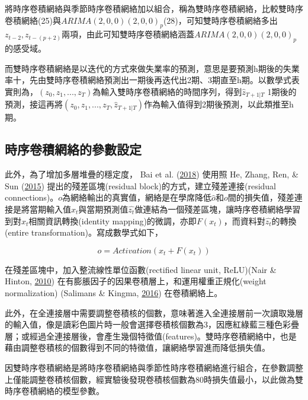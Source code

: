 \documentclass[oneside]{book}
\begin{document}
將時序卷積網絡與季節時序卷積網絡加以組合，稱為雙時序卷積網絡，比較雙時序卷積網絡(25)與\(ARIMA(2,0,0)(2,0,0)_p\)(28)，可知雙時序卷積網絡多出\(z_{t-2},z_{t-(p+2)}\)兩項，由此可知雙時序卷積網絡涵蓋\(ARIMA(2,0,0)(2,0,0)_p\)的感受域。

而雙時序卷積網絡是以迭代的方式來做失業率的預測，意思是要預測h期後的失業率十，先由雙時序卷積網絡預測出一期後再迭代出2期、3期直至h期。以數學式表實則為，\((z_0,z_1,...,z_T)\)為輸入雙時序卷積網絡的時間序列，得到\(\hat{z}_{T+1|T}\) 1期後的預測，接這再將\((z_0,z_1,...,z_T,\hat{z}_{T+1|T})\)作為輸入值得到2期後預測，以此類推至h期。

\hypertarget{ux6642ux5e8fux5377ux7a4dux7db2ux7d61ux7684ux53c3ux6578ux8a2dux5b9a}{%
\subsection{時序卷積網絡的參數設定}\label{ux6642ux5e8fux5377ux7a4dux7db2ux7d61ux7684ux53c3ux6578ux8a2dux5b9a}}

此外，為了增加多層堆疊的穩定度， Bai et al. (\protect\hyperlink{ref-baiEmpiricalEvaluationGeneric2018}{2018}) 使用照 He, Zhang, Ren, \& Sun (\protect\hyperlink{ref-heDeepResidualLearning2015}{2015}) 提出的殘差區塊(residual block)的方式，建立殘差連接(residual connections)。\(o\)為網絡輸出的真實值，網絡是在學席降低\(\hat{o}\)和\(o\)間的損失值，殘差連接是將當期輸入值\(x_t\)與當期預測值\(\hat{z_t}\)做連結為一個殘差區塊，讓時序卷積網絡學習到對\(x_t\)相關資訊轉換(identity mapping)的微調，亦即\(F(x_t)\)，而資料對\(\hat{z_t}\)的轉換(entire transformation)。寫成數學式如下，

\[o = Activation(x_t+F(x_t))\]

在殘差區塊中，加入整流線性單位函數(rectified linear unit, ReLU)(Nair \& Hinton, \protect\hyperlink{ref-nairRectifiedLinearUnits2010}{2010}) 在有膨脹因子的因果卷積層上，和運用權重正規化(weight normalization) (Salimans \& Kingma, \protect\hyperlink{ref-salimansWeightNormalizationSimple2016}{2016}) 在卷積網絡上。

此外，在全連接層中需要調整卷積核的個數，意味著進入全連接層前一次讀取幾層的輸入值，像是讀彩色圖片時一般會選擇卷積核個數為3，因應紅綠藍三種色彩疊層；或經過全連接層後，會產生幾個特徵值(features)。雙時序卷積網絡中，也是藉由調整卷積核的個數得到不同的特徵值，讓網絡學習進而降低損失值。

因雙時序卷積網絡是將時序卷積網絡與季節性時序卷積網絡進行組合，在參數調整上僅能調整卷積核個數，經實驗後發現卷積核個數為80時損失值最小，以此做為雙時序卷積網絡的模型參數。
\end{document}
